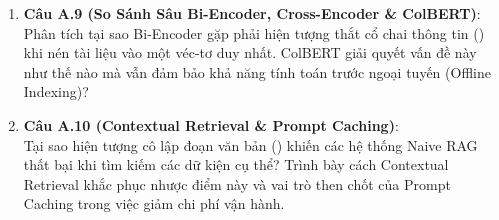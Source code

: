 \begin{enumerate}
  \item \textbf{Câu A.9 (So Sánh Sâu Bi-Encoder, Cross-Encoder \& ColBERT)}: \\
  Phân tích tại sao Bi-Encoder gặp phải hiện tượng thắt cổ chai thông tin () khi nén tài liệu vào một véc-tơ duy nhất. ColBERT giải quyết vấn đề này như thế nào mà vẫn đảm bảo khả năng tính toán trước ngoại tuyến (Offline Indexing)?
  \item \textbf{Câu A.10 (Contextual Retrieval \& Prompt Caching)}: \\
  Tại sao hiện tượng cô lập đoạn văn bản () khiến các hệ thống Naive RAG thất bại khi tìm kiếm các dữ kiện cụ thể? Trình bày cách Contextual Retrieval khắc phục nhược điểm này và vai trò then chốt của Prompt Caching trong việc giảm chi phí vận hành.
\end{enumerate}

